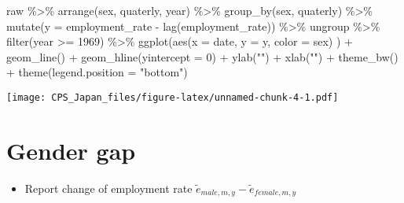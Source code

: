 \documentclass[
]{book}
\newenvironment{Shaded}{\begin{snugshade}}{\end{snugshade}}
\newcommand{\AttributeTok}[1]{\textcolor[rgb]{0.77,0.63,0.00}{#1}}
\newcommand{\DecValTok}[1]{\textcolor[rgb]{0.00,0.00,0.81}{#1}}
\newcommand{\FunctionTok}[1]{\textcolor[rgb]{0.00,0.00,0.00}{#1}}
\newcommand{\NormalTok}[1]{#1}
\newcommand{\SpecialCharTok}[1]{\textcolor[rgb]{0.00,0.00,0.00}{#1}}
\newcommand{\StringTok}[1]{\textcolor[rgb]{0.31,0.60,0.02}{#1}}
\providecommand{\tightlist}{%
  \setlength{\itemsep}{0pt}\setlength{\parskip}{0pt}}
\begin{document}
\begin{Shaded}
\begin{Highlighting}[]
\NormalTok{raw }\SpecialCharTok{\%\textgreater{}\%}
  \FunctionTok{arrange}\NormalTok{(sex,}
\NormalTok{          quaterly,}
\NormalTok{          year) }\SpecialCharTok{\%\textgreater{}\%}
  \FunctionTok{group\_by}\NormalTok{(sex,}
\NormalTok{           quaterly) }\SpecialCharTok{\%\textgreater{}\%}
  \FunctionTok{mutate}\NormalTok{(}\AttributeTok{y =}\NormalTok{ employment\_rate }\SpecialCharTok{{-}} \FunctionTok{lag}\NormalTok{(employment\_rate)) }\SpecialCharTok{\%\textgreater{}\%}
\NormalTok{  ungroup }\SpecialCharTok{\%\textgreater{}\%}
  \FunctionTok{filter}\NormalTok{(year }\SpecialCharTok{\textgreater{}=} \DecValTok{1969}\NormalTok{) }\SpecialCharTok{\%\textgreater{}\%}
  \FunctionTok{ggplot}\NormalTok{(}\FunctionTok{aes}\NormalTok{(}\AttributeTok{x =}\NormalTok{ date,}
             \AttributeTok{y =}\NormalTok{ y,}
             \AttributeTok{color =}\NormalTok{ sex)}
\NormalTok{         ) }\SpecialCharTok{+}
  \FunctionTok{geom\_line}\NormalTok{() }\SpecialCharTok{+}
  \FunctionTok{geom\_hline}\NormalTok{(}\AttributeTok{yintercept =} \DecValTok{0}\NormalTok{) }\SpecialCharTok{+}
  \FunctionTok{ylab}\NormalTok{(}\StringTok{""}\NormalTok{) }\SpecialCharTok{+}
  \FunctionTok{xlab}\NormalTok{(}\StringTok{""}\NormalTok{) }\SpecialCharTok{+}
  \FunctionTok{theme\_bw}\NormalTok{() }\SpecialCharTok{+}
  \FunctionTok{theme}\NormalTok{(}\AttributeTok{legend.position =} \StringTok{"bottom"}\NormalTok{)}
\end{Highlighting}
\end{Shaded}

\texttt{[image: CPS\_Japan\_files/figure-latex/unnamed-chunk-4-1.pdf]}

\hypertarget{gender-gap}{%
\section{Gender gap}\label{gender-gap}}

\begin{itemize}
\tightlist
\item
  Report change of employment rate \(\tilde e_{male,m,y} - \tilde e_{female,m,y}\)
\end{itemize}
\end{document}
